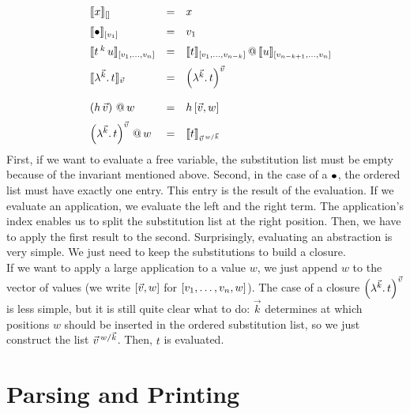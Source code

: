 \documentclass[submission,copyright,creativecommons]{eptcs}
\begin{document}
\[ 
\begin{array}{llll}
& \ev x {\emptyVec} & = & x \\ \noalign{\medskip}
& \ev \ovar {\ve{v_1}} & = & v_1 \\  \noalign{\medskip}
& \ev {t \oapp k u} {\ve{v_1, \ldots, v_n}} & = & {\ev t {\ve{v_1, \ldots, v_{n-k}}}} \ap {\ev u {\ve{v_{n-k+1}, \ldots, v_n}}} \\  \noalign{\medskip}
& \ev {\LaO {\vec k} t}  {\vec v} & = & \Val {\vec k} t {\vec v} \\  
\\ 
& \pa{h \sspace \vec v} \ap w & = & h \sspace \ve{\vec v, w} 
\\ \noalign{\medskip}
& \Val{\vec k} t {\vec v}   \ap w & = & \ev t {\multiinsert{\vec v}{\vec k}{w}}
\end{array}
\]
First, if we want to evaluate a free variable, the substitution list must be empty because of the invariant mentioned above. 
Second, in the case of a $\ovar$, the ordered list must have exactly one entry. This entry is the result of the evaluation. 
If we evaluate an application, we evaluate the left and the right term. The application's index enables us to split the substitution list at the right position. Then, we have to apply the first result to the second. 
Surprisingly, evaluating an abstraction is very simple. We just need to keep the substitutions to build a closure. \\
If we want to apply a large application to a value $w$, we just append $w$ to the vector of values (we write $\ve{\vec v, w}$ for $\ve{v_1, \ldots, v_n, w}$). 
The case of a closure $\Val {\vec k} t {\vec v}$ is less simple, but it is still quite clear what to do: $\vec k$ determines at which positions $w$ should be inserted in the ordered substitution list, so we just construct the list $\multiinsert {\vec v} {\vec k} w$. Then, $t$ is evaluated.


\section{Parsing and Printing}
\end{document}
